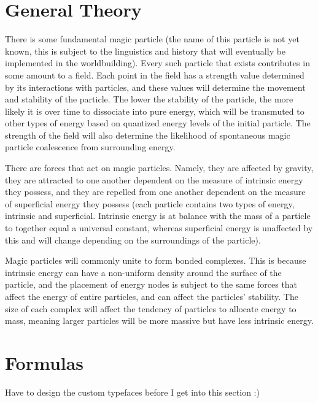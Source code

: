 \documentclass[a4paper]{article}
\begin{document}
\section{General Theory}
There is some fundamental magic particle (the name of this particle is not yet known, this is subject to the linguistics and history that will eventually be implemented in the worldbuilding). Every such particle that exists contributes in some amount to a field. Each point in the field has a strength value determined by its interactions with particles, and these values will determine the movement and stability of the particle. The lower the stability of the particle, the more likely it is over time to dissociate into pure energy, which will be transmuted to other types of energy based on quantized energy levels of the initial particle. The strength of the field will also determine the likelihood of spontaneous magic particle coalescence from surrounding energy.

There are forces that act on magic particles. Namely, they are affected by gravity, they are attracted to one another dependent on the measure of intrinsic energy they possess, and they are repelled from one another dependent on the measure of superficial energy they possess (each particle contains two types of energy, intrinsic and superficial. Intrinsic energy is at balance with the mass of a particle to together equal a universal constant, whereas superficial energy is unaffected by this and will change depending on the surroundings of the particle).

Magic particles will commonly unite to form bonded complexes. This is because intrinsic energy can have a non-uniform density around the surface of the particle, and the placement of energy nodes is subject to the same forces that affect the energy of entire particles, and can affect the particles' stability. The size of each complex will affect the tendency of particles to allocate energy to mass, meaning larger particles will be more massive but have less intrinsic energy.

\section{Formulas}
Have to design the custom typefaces before I get into this section :)
\end{document}
